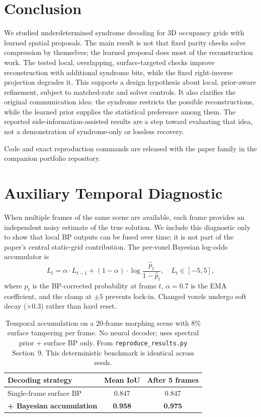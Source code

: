 \documentclass[11pt,a4paper]{article}
\begin{document}
\section{Conclusion}

We studied underdetermined syndrome decoding for 3D occupancy grids with
learned spatial proposals. The main result is not that fixed parity checks
solve compression by themselves; the learned proposal does most of the
reconstruction work. The tested local, overlapping, surface-targeted checks improve
reconstruction with additional syndrome bits, while the fixed right-inverse
projection degrades it. This supports a design hypothesis about local,
prior-aware refinement, subject to matched-rate and solver controls.
It also clarifies the original communication idea: the syndrome restricts
the possible reconstructions, while the learned prior supplies the
statistical preference among them. The reported side-information-assisted
results are a step toward evaluating that idea, not a demonstration of
syndrome-only or lossless recovery.

Code and exact reproduction commands are released with the paper family in the
companion portfolio repository.

\appendix
\section{Auxiliary Temporal Diagnostic}
\label{sec:temporal}

When multiple frames of the same scene are available, each frame provides an
independent noisy estimate of the true solution. We include this diagnostic
only to show that local BP outputs can be fused over time; it is not part of
the paper's central static-grid contribution. The per-voxel Bayesian
log-odds accumulator is
\begin{equation}
  L_t = \alpha \cdot L_{t-1} + (1-\alpha) \cdot
    \log\frac{\hat{p}_t}{1 - \hat{p}_t},
  \quad L_t \in [-5, 5],
\end{equation}
where $\hat{p}_t$ is the BP-corrected probability at frame $t$,
$\alpha = 0.7$ is the EMA coefficient, and the clamp at $\pm 5$
prevents lock-in. Changed voxels undergo soft decay ($\times 0.3$)
rather than hard reset.

\begin{table}[htbp]
\centering
\caption{Temporal accumulation on a 20-frame morphing scene with
  8\% surface tampering per frame. No neural decoder; uses spectral prior +
  surface BP only. From \texttt{reproduce\_results.py} Section~9. This
  deterministic benchmark is identical across seeds.}
\label{tab:temporal}
\begin{tabular}{lcc}
\toprule
Decoding strategy & Mean IoU & After 5 frames \\
\midrule
Single-frame surface BP & 0.847 & 0.847 \\
\textbf{+ Bayesian accumulation} & \textbf{0.958} & \textbf{0.975} \\
\bottomrule
\end{tabular}
\end{table}
\end{document}
